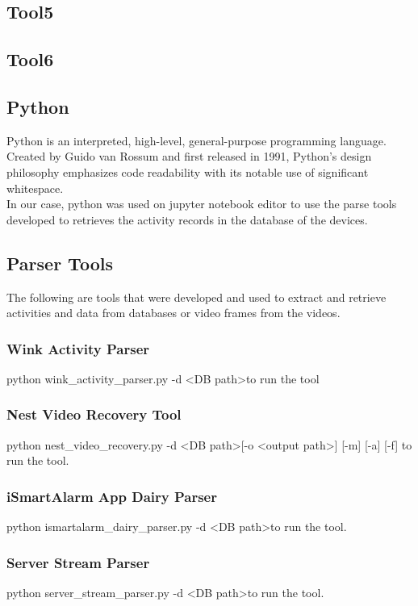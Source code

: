 \documentclass{easychair}
\begin{document}
\subsection{Tool5}
\subsection{Tool6}


\subsection{Python}
Python is an interpreted, high-level, general-purpose programming language. Created by Guido van Rossum and first released in 1991, Python's design philosophy emphasizes code readability with its notable use of significant whitespace. \cite{Ali_1} \\
In our case, python was used on jupyter notebook editor \cite{Ali_2} to use the parse tools developed to retrieves the activity records in the database of the devices.


\subsection{Parser Tools}
The following are tools that were developed and used to extract and retrieve activities and data from databases or video frames from the videos. \cite{Ali_3}
\subsubsection{Wink Activity Parser}
python wink\_activity\_parser.py -d \textless DB path\textgreater to run the tool
\subsubsection{Nest Video Recovery Tool}
python nest\_video\_recovery.py -d \textless DB path\textgreater [-o \textless output path\textgreater] [-m] [-a] [-f] to run the tool.
\subsubsection{iSmartAlarm App Dairy Parser}
python ismartalarm\_dairy\_parser.py -d \textless DB path\textgreater to run the tool.
\subsubsection{Server Stream Parser}
python server\_stream\_parser.py -d \textless DB path\textgreater to run the tool.
\end{document}
